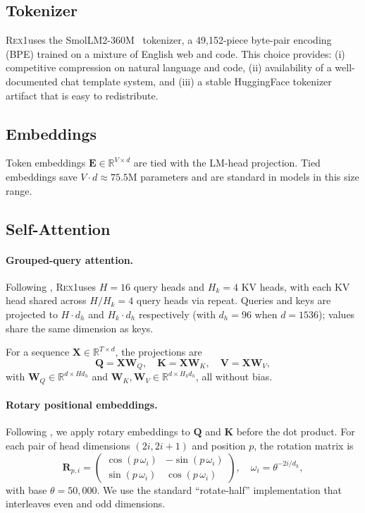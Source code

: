 \documentclass[11pt,a4paper]{article}
\newcommand{\REX}{\textsc{Rex1}\xspace}
\providecommand{\xspace}{}
\begin{document}
\subsection{Tokenizer}

\REX uses the SmolLM2-360M~\cite{smollm2} tokenizer, a 49{,}152-piece byte-pair
encoding (BPE) trained on a mixture of English web and code. This choice
provides:
(i) competitive compression on natural language and code,
(ii) availability of a well-documented chat template system, and
(iii) a stable HuggingFace tokenizer artifact that is easy to redistribute.

\subsection{Embeddings}

Token embeddings $\mathbf{E} \in \mathbb{R}^{V \times d}$ are tied with the
LM-head projection. Tied embeddings save $V \cdot d \approx 75.5\mathrm{M}$
parameters and are standard in models in this size range.

\subsection{Self-Attention}

\paragraph{Grouped-query attention.}
Following \cite{gqa}, \REX uses $H = 16$ query heads and $H_k = 4$ KV heads,
with each KV head shared across $H/H_k = 4$ query heads via repeat. Queries
and keys are projected to $H \cdot d_h$ and $H_k \cdot d_h$ respectively
(with $d_h = 96$ when $d = 1536$); values share the same dimension as keys.

For a sequence $\mathbf{X} \in \mathbb{R}^{T \times d}$, the projections are
\begin{equation}
\mathbf{Q} = \mathbf{X}\mathbf{W}_Q, \quad
\mathbf{K} = \mathbf{X}\mathbf{W}_K, \quad
\mathbf{V} = \mathbf{X}\mathbf{W}_V,
\end{equation}
with $\mathbf{W}_Q \in \mathbb{R}^{d \times H d_h}$ and
$\mathbf{W}_K, \mathbf{W}_V \in \mathbb{R}^{d \times H_k d_h}$, all without
bias.

\paragraph{Rotary positional embeddings.}
Following \cite{rope}, we apply rotary embeddings to $\mathbf{Q}$ and
$\mathbf{K}$ before the dot product. For each pair of head dimensions
$(2i, 2i+1)$ and position $p$, the rotation matrix is
\begin{equation}
\mathbf{R}_{p,i} = \begin{pmatrix} \cos(p\, \omega_i) & -\sin(p\, \omega_i) \\
\sin(p\, \omega_i) & \cos(p\, \omega_i) \end{pmatrix},
\quad
\omega_i = \theta^{-2i / d_h},
\end{equation}
with base $\theta = 50{,}000$. We use the standard ``rotate-half'' implementation
that interleaves even and odd dimensions.
\end{document}
